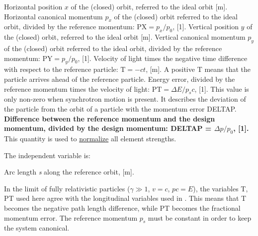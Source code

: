 \begin{5.02.06}
\begin{madlist}
	 Horizontal position $x$ of the (closed) orbit,
	referred to the ideal orbit [m].    
	 Horizontal canonical momentum $p_x$ of the
	(closed) orbit referred to the ideal orbit, divided by the
	reference momentum: $\textrm{PX} = p_x / p_0$, [1].   
	 Vertical position $y$ of the (closed) orbit, referred
	to the ideal orbit [m].   
	 Vertical canonical momentum $p_y$ of the (closed)
	orbit referred to the ideal orbit, divided by the reference
	momentum: $\textrm{PY} = p_y / p_0$, [1].   
	 Velocity of light times the negative time difference with
	respect to the reference particle: $\textrm{T} =  - c t$, [m]. A
	positive T means that the particle arrives ahead of the reference
	particle.   
	 Energy error, divided by the reference momentum times the
	velocity of light: $\textrm{PT} = \Delta E / p_s c$, [1]. 
	This value is only non-zero when synchrotron motion is
	present. It describes the deviation of the particle from the orbit
	of a particle with the momentum error DELTAP.   
	 {\bf Difference between the reference momentum and the design
	momentum, divided by the design momentum: DELTAP =
	$\Delta p / p_0$, [1].} This quantity is used to
	\hyperref[chap:differences]{normalize} all element strengths.   
\end{madlist} 
\end{5.02.06}


The independent variable is: 
\begin{madlist}
    Arc length {\it s} along the reference orbit, 
  [m].   
\end{madlist} 

In the limit of fully relativistic particles ($\gamma \gg 1$, $v = c$,
$p c = E$), the variables T, PT used here agree with the
longitudinal variables used in \cite{TRANSPORT}. This means that T
becomes the negative path length difference, while PT becomes the
fractional momentum error. The reference momentum $p_s$ must be
constant in order to keep the system canonical.  


